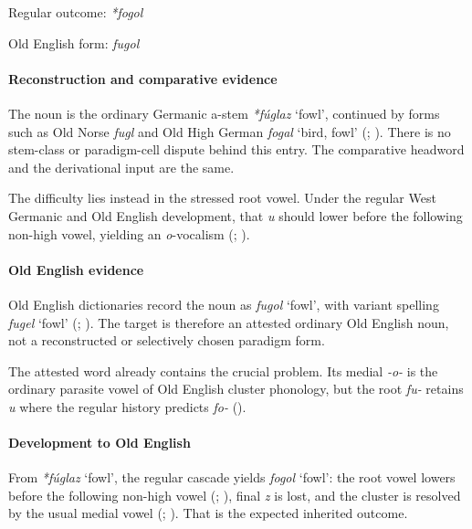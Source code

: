 \documentclass[
  british,
  a4paper,
]{article}
\providecommand{\Recon}[1]{\emph{*#1}}
\begin{document}
Regular outcome: \Recon{fogol}

Old English form: \emph{fugol}

\paragraph{Reconstruction and comparative
evidence}\label{reconstruction-and-comparative-evidence-154}

The noun is the ordinary Germanic a-stem \Recon{fúglaz} `fowl',
continued by forms such as Old Norse \emph{fugl} and Old High German
{\emph{fogal}} `bird, fowl' (; ). There is no stem-class
or paradigm-cell dispute behind this entry. The comparative headword and
the derivational input are the same.

The difficulty lies instead in the stressed root vowel. Under the
regular West Germanic and Old English development, that \emph{u} should
lower before the following non-high vowel, yielding an \emph{o}-vocalism
(;
).

\paragraph{Old English evidence}\label{old-english-evidence-156}

Old English dictionaries record the noun as \emph{fugol} `fowl', with
variant spelling \emph{fugel} `fowl'
(;
). The target is
therefore an attested ordinary Old English noun, not a reconstructed or
selectively chosen paradigm form.

The attested word already contains the crucial problem. Its medial
\emph{-o-} is the ordinary parasite vowel of Old English cluster
phonology, but the root \emph{fu-} retains \emph{u} where the regular
history predicts \emph{fo-} ().

\paragraph{Development to Old
English}\label{development-to-old-english-155}

From \Recon{fúglaz} `fowl', the regular cascade yields \emph{fogol}
`fowl': the root vowel lowers before the following non-high vowel
(;
), final \emph{z} is lost,
and the cluster is resolved by the usual medial vowel
(;
). That is the expected
inherited outcome.
\end{document}
